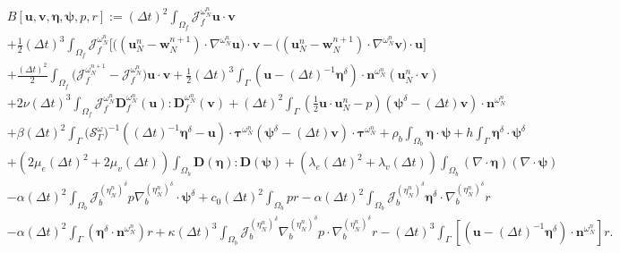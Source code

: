 \documentclass[11pt]{article}
\newcommand{\bd}{\boldsymbol}
\theoremstyle{definition}
\begin{document}
\begin{small}
\begin{align}\label{bilinear}
&B[\bd{u}, \bd{v}, \bd{\eta}, \bd{\psi}, p, r] := (\Delta t)^{2} \int_{\Omega_{f}} \mathcal{J}^{\omega^{n}_{N}}_{f} \boldsymbol{u} \cdot \boldsymbol{v} \nonumber \\
&+ \frac{1}{2} (\Delta t)^{3} \int_{\Omega_{f}} \mathcal{J}^{\omega^{n}_{N}}_{f} \Big[\Big((\boldsymbol{u}^{n}_{N} - \bd{w}^{n + 1}_{N}) \cdot \nabla^{\omega^{n}_{N}} \boldsymbol{u}\Big) \cdot \boldsymbol{v} - \Big((\boldsymbol{u}^{n}_{N} - \bd{w}^{n + 1}_{N}) \cdot \nabla^{\omega^{n}_{N}} \boldsymbol{v}\Big) \cdot \boldsymbol{u}\Big] \nonumber \\
&+ \frac{(\Delta t)^{2}}{2} \int_{\Omega_{f}} \Big(\mathcal{J}^{\omega^{n + 1}_{N}}_{f} - \mathcal{J}^{\omega^{n}_{N}}_{f}\Big) \boldsymbol{u} \cdot \boldsymbol{v} + \frac{1}{2} (\Delta t)^{3} \int_{\Gamma} (\boldsymbol{u} - (\Delta t)^{-1} \boldsymbol{\eta}^{\delta}) \cdot \boldsymbol{n}^{\omega^{n}_{N}} (\boldsymbol{u}^{n}_{N} \cdot \boldsymbol{v}) \nonumber \\
&+ 2\nu (\Delta t)^{3} \int_{\Omega_{f}} \mathcal{J}^{\omega^{n}_{N}}_{f} \boldsymbol{D}^{\omega^{n}_{N}}_{f}(\boldsymbol{u}) : \boldsymbol{D}^{\omega^{n}_{N}}_{f}(\boldsymbol{v}) + (\Delta t)^{2} \int_{\Gamma} \left(\frac{1}{2}\boldsymbol{u} \cdot \boldsymbol{u}^{n}_{N} - p\right)(\boldsymbol{\psi}^{\delta} - (\Delta t) \boldsymbol{v})\cdot \boldsymbol{n}^{\omega^{n}_{N}} \nonumber \\
&+ \beta (\Delta t)^{2} \int_{\Gamma} \Big(\mathcal{S}^{\omega}_{\Gamma}\Big)^{-1} \left((\Delta t)^{-1} \boldsymbol{\eta}^{\delta} - \boldsymbol{u}\right) \cdot \boldsymbol{\tau}^{\omega^{n}_{N}} (\boldsymbol{\psi}^{\delta} - (\Delta t) \boldsymbol{v}) \cdot \boldsymbol{\tau}^{\omega^{n}_{N}} + \rho_{b} \int_{\Omega_{b}} \boldsymbol{\eta} \cdot \boldsymbol{\psi} + h \int_{\Gamma} \boldsymbol{\eta}^{\delta} \cdot \boldsymbol{\psi}^{\delta} \nonumber \\
&+ (2\mu_{e} (\Delta t)^{2} + 2\mu_{v}(\Delta t)) \int_{\Omega_{b}} \boldsymbol{D}(\boldsymbol{\eta}) : \boldsymbol{D}(\boldsymbol{\psi}) + (\lambda_{e} (\Delta t)^{2} + \lambda_{v}(\Delta t)) \int_{\Omega_{b}} (\nabla \cdot \boldsymbol{\eta})(\nabla \cdot \boldsymbol{\psi}) \nonumber \\
&- \alpha (\Delta t)^{2} \int_{\Omega_{b}} \mathcal{J}^{(\eta^{n}_{N})^{\delta}}_{b} p \nabla^{(\eta^{n}_{N})^{\delta}}_{b} \cdot \boldsymbol{\psi}^{\delta} + c_{0} (\Delta t)^{2} \int_{\Omega_{b}} p r - \alpha (\Delta t)^{2} \int_{\Omega_{b}} \mathcal{J}^{(\eta^{n}_{N})^{\delta}}_{b} \boldsymbol{\eta}^{\delta} \cdot \nabla^{(\eta^{n}_{N})^{\delta}}_{b} r \nonumber \\
&- \alpha (\Delta t)^{2} \int_{\Gamma} (\boldsymbol{\eta}^{\delta} \cdot \boldsymbol{n}^{\omega^{n}_{N}}) r + \kappa (\Delta t)^{3} \int_{\Omega_{b}} \mathcal{J}^{(\eta^{n}_{N})^{\delta}}_{b} \nabla^{(\eta^{n}_{N})^{\delta}}_{b} p \cdot \nabla^{(\eta^{n}_{N})^{\delta}}_{b} r - (\Delta t)^{3} \int_{\Gamma} [(\boldsymbol{u} - (\Delta t)^{-1} \boldsymbol{\eta}^{\delta})\cdot \boldsymbol{n}^{\omega^{n}_{N}}]r.
\end{align}
\end{small}
\end{document}
